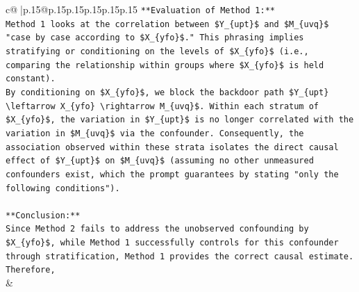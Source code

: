\documentclass{article}
\begin{document}
{\begin{supertabular}{c@{$\;$}|p{.15\linewidth}@{}p{.15\linewidth}p{.15\linewidth}p{.15\linewidth}p{.15\linewidth}p{.15\linewidth}}
{{{\texttt{**Evaluation of Method 1:**} \\
\texttt{Method 1 looks at the correlation between \$Y\_\{upt\}\$ and \$M\_\{uvq\}\$ "case by case according to \$X\_\{yfo\}\$." This phrasing implies stratifying or conditioning on the levels of \$X\_\{yfo\}\$ (i.e., comparing the relationship within groups where \$X\_\{yfo\}\$ is held constant).} \\
\texttt{By conditioning on \$X\_\{yfo\}\$, we block the backdoor path \$Y\_\{upt\} \textbackslash{}leftarrow X\_\{yfo\} \textbackslash{}rightarrow M\_\{uvq\}\$. Within each stratum of \$X\_\{yfo\}\$, the variation in \$Y\_\{upt\}\$ is no longer correlated with the variation in \$M\_\{uvq\}\$ via the confounder. Consequently, the association observed within these strata isolates the direct causal effect of \$Y\_\{upt\}\$ on \$M\_\{uvq\}\$ (assuming no other unmeasured confounders exist, which the prompt guarantees by stating "only the following conditions").} \\
\\ 
\texttt{**Conclusion:**} \\
\texttt{Since Method 2 fails to address the unobserved confounding by \$X\_\{yfo\}\$, while Method 1 successfully controls for this confounder through stratification, Method 1 provides the correct causal estimate. Therefore,} \\
            }
        }
    }
    & \\ \\


\end{supertabular}}
\end{document}
